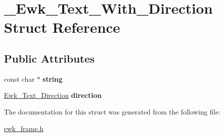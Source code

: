 \hypertarget{struct__Ewk__Text__With__Direction}{\section{\+\_\+\+Ewk\+\_\+\+Text\+\_\+\+With\+\_\+\+Direction Struct Reference}
\label{struct__Ewk__Text__With__Direction}
}
\subsection*{Public Attributes}
\begin{DoxyCompactItemize}
\item 
\hypertarget{struct__Ewk__Text__With__Direction_afef97f7e64c04b8219abd2946ba9fe34}{const char $\ast$ {\bfseries string}}\label{struct__Ewk__Text__With__Direction_afef97f7e64c04b8219abd2946ba9fe34}

\item 
\hypertarget{struct__Ewk__Text__With__Direction_a226ec3971f67c32a7753aba7cdde84ac}{\hyperlink{ewk__frame_8h_a6949882f3b66bb6bcbbb9cc3021716cc}{Ewk\+\_\+\+Text\+\_\+\+Direction} {\bfseries direction}}\label{struct__Ewk__Text__With__Direction_a226ec3971f67c32a7753aba7cdde84ac}

\end{DoxyCompactItemize}


The documentation for this struct was generated from the following file\+:\begin{DoxyCompactItemize}
\item 
\hyperlink{ewk__frame_8h}{ewk\+\_\+frame.\+h}\end{DoxyCompactItemize}
